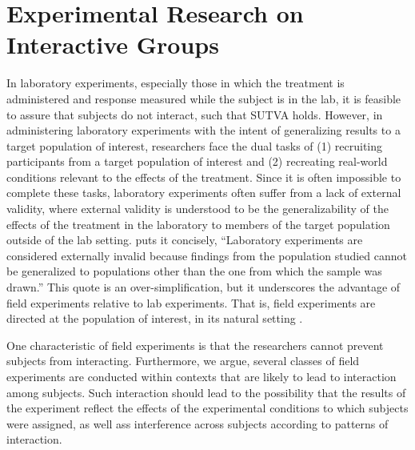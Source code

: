 \documentclass[12pt]{article}
\begin{document}
\section{Experimental Research on Interactive Groups}


In laboratory experiments, especially those in which the treatment is administered and response measured while the subject is in the lab, it is feasible to assure that subjects do not interact, such that SUTVA holds. However, in administering laboratory experiments with the intent of generalizing results to a target population of interest, researchers face the dual tasks of (1) recruiting participants from a target population of interest and (2) recreating real-world conditions relevant to the effects of the treatment. Since it is often impossible to complete these tasks, laboratory experiments often suffer from a lack of external validity, where external validity is understood to be the generalizability of the effects of the treatment in the laboratory to members of the target population outside of the lab setting. \citet[p.245]{lucas2003} puts it concisely, ``Laboratory experiments are considered externally invalid because findings from the population studied cannot be generalized to populations other than the one from which the sample was drawn.'' This quote is an over-simplification, but it underscores the advantage of field experiments relative to lab experiments. That is, field experiments are directed at the population of interest, in its natural setting \citep{list2014field}. 

One characteristic of field experiments is that the researchers cannot prevent subjects from interacting. Furthermore, we argue, several classes of field experiments are conducted within contexts that are likely to lead to interaction among subjects. Such interaction should lead to the possibility that the results of the experiment reflect the effects of the experimental conditions to which subjects were assigned, as well ass interference across subjects according to patterns of interaction. 
\end{document}
